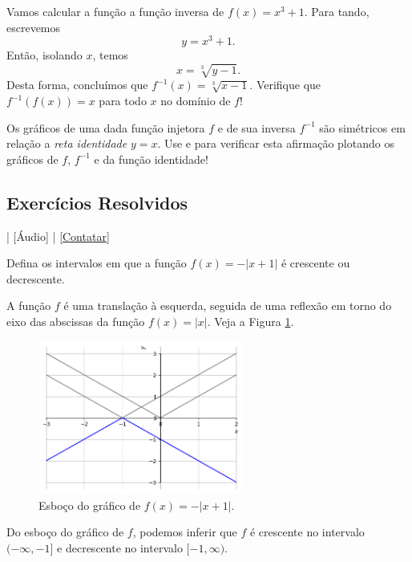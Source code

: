 \begin{ex}
  Vamos calcular a função a função inversa de $f(x) = x^3 + 1$. Para tando, escrevemos
  \begin{equation}
    y = x^3 + 1.
  \end{equation}
  Então, isolando $x$, temos
  \begin{equation}
    x = \sqrt[3]{y - 1}.
  \end{equation}
  Desta forma, concluímos que $f^{-1}(x) = \sqrt[3]{x-1}$. Verifique que $f^{-1}(f(x)) = x$ para todo $x$ no domínio de $f$!
\end{ex}

\begin{obs}
  Os gráficos de uma dada função injetora $f$ e de sua inversa $f^{-1}$ são simétricos em relação a \emph{reta identidade} $y=x$.
  \ifispython
  Use {\python} e {\sympy} para verificar esta afirmação plotando os gráficos de $f$, $f^{-1}$ e da função identidade!
  \fi
\end{obs}

\subsection*{Exercícios Resolvidos}

\begin{flushright}
  [Vídeo] | [Áudio] | \href{https://phkonzen.github.io/notas/contato.html}{[Contatar]}
\end{flushright}

\begin{exeresol}
  Defina os intervalos em que a função $f(x) = -|x+1|$ é crescente ou decrescente.
\end{exeresol}
\begin{resol}
  A função $f$ é uma translação à esquerda, seguida de uma reflexão em torno do eixo das abscissas da função $f(x) = |x|$. Veja a Figura \ref{fig:exeresol_funprop_mono}.

  \begin{figure}[H]
    \centering
    \includegraphics[width=0.6\textwidth]{./cap_funcao/dados/fig_exeresol_funprop_mono/fig_exeresol_funprop_mono.png}
    \caption{Esboço do gráfico de $f(x) = -|x+1|$.}
    \label{fig:exeresol_funprop_mono}
  \end{figure}

  Do esboço do gráfico de $f$, podemos inferir que $f$ é crescente no intervalo $(-\infty, -1]$ e decrescente no intervalo $[-1, \infty)$.
\end{resol}

